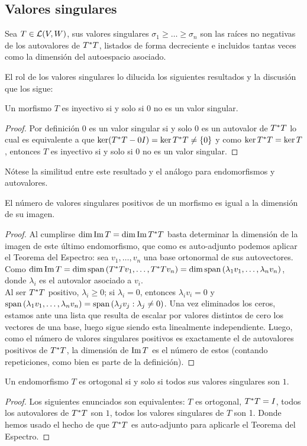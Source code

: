 \subsection{Valores singulares}
\begin{definition}
	Sea $T\in\mathcal{L}(V,W)$, sus valores singulares $\sigma_1 \geq \ldots\geq \sigma_n$ son las raíces no negativas de los autovalores de $T^{\ast} T$, listados de forma decreciente e incluidos tantas veces como la dimensión del autoespacio asociado.
\end{definition}
El rol de los valores singulares lo dilucida los siguientes resultados y la discusión que los sigue:
\begin{proposition}
	Un morfismo $T$ es inyectivo si y solo si $0$ no es un valor singular.
\end{proposition}
\begin{proof}
	Por definición $0$ es un valor singular si y solo $0$ es un autovalor de $T^{\ast} T$ lo cual es equivalente a que $\ker(T^{\ast} T-0I)=\ker T^{\ast} T \neq \{0\} $ y como $\ker T^{\ast} T=\ker T$, entonces $T$ es inyectivo si y solo si $0$ no es un valor singular.
\end{proof}
Nótese la similitud entre este resultado y el análogo para endomorfismos y autovalores.\\
\begin{proposition}
	El número de valores singulares positivos de un morfismo es igual a la dimensión de su imagen.
\end{proposition}
\begin{proof}
	Al cumplirse $\dim\operatorname{Im} T=\dim\operatorname{Im} T^{\ast} T$ basta determinar la dimensión de la imagen de este último endomorfismo, que como es auto-adjunto podemos aplicar el Teorema del Espectro: sea $v_1,\ldots,v_n$ una base ortonormal de sus autovectores.\\
	Como $\dim\operatorname{Im} T= \dim \operatorname{span}\left(T^{\ast} T v_1,\ldots, T^{\ast} T v_n \right)=\dim\operatorname{span}\left(\lambda_1 v_1, \ldots,\lambda_n v_n\right)$, donde $\lambda_i$ es el autovalor asociado a $v_i$.\\
	Al ser $T^{\ast} T$ positivo, $\lambda_i \geq 0$; si $\lambda_i=0$, entonces $\lambda_i v_i=0$ y $\operatorname{span}\left(\lambda_1 v_1, \ldots, \lambda_n v_n\right) = \operatorname{span}\left(\lambda_j v_j : \lambda_j \neq 0\right)$. Una vez eliminados los ceros, estamos ante una lista que resulta de escalar por valores distintos de cero los vectores de una base, luego sigue siendo esta linealmente independiente. Luego, como el número de valores singulares positivos es exactamente el de autovalores positivos de $T^{\ast} T$, la dimensión de $\operatorname{Im} T$ es el número de estos (contando repeticiones, como bien es parte de la definición).
\end{proof}
\begin{proposition}
	Un endomorfismo $T$ es ortogonal si y solo si todos sus valores singulares son $1$.
\end{proposition}
\begin{proof}
	Los siguientes enunciados son equivalentes: $T$ es ortogonal, $T^{\ast} T=I$, todos los autovalores de $T^{\ast} T$ son $1$, todos los valores singulares de $T$ son 1. Donde hemos usado el hecho de que $T^{\ast} T$ es auto-adjunto para aplicarle el Teorema del Espectro.
\end{proof}
